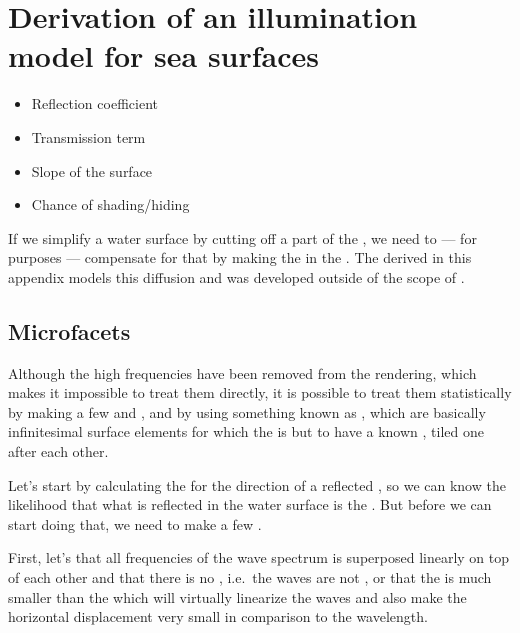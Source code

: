 \chapter{Derivation of an illumination model for sea surfaces}
\label{chap:illumination_model_derivation}

\begin{itemize}
\item Reflection coefficient
\item Transmission term
\item Slope of the surface
\item Chance of shading/hiding
\end{itemize}

\HRule

{
If we simplify a water surface by cutting off a part of the , we need to --- for \rendering purposes --- compensate for that by making the  in the  . The  derived in this appendix models this diffusion and was developed outside of the scope of \thismasterthesiswork.

\section{Microfacets}

Although the high frequencies have been removed from the rendering, which makes it impossible to treat them directly, it is possible to treat them statistically by making a few \assumptions and \approximations, and by using something known as \microfacets, which are basically infinitesimal surface elements for which the  is \stochastic but \assumed to have a known , tiled one after each other.

Let's start by calculating the  for the direction of a reflected \ray, so we can know the likelihood that what is reflected in the water surface is the \sun. But before we can start doing that, we need to make a few \assumptions.

First, let's \assume that all frequencies of the wave spectrum is superposed linearly on top of each other and that there is no , i.e.\ the waves are not , or that the  is much smaller than the \wavelength which will virtually linearize the waves and also make the horizontal displacement very small in comparison to the wavelength.

}

